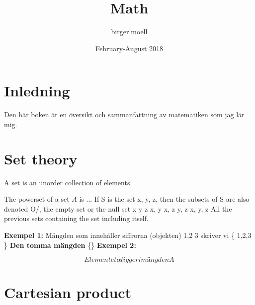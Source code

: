 \documentclass{article}
\title{Math}
\author{birger.moell }
\date{February-August 2018}
\begin{document}
\maketitle

\section{Inledning}
Den här boken är en översikt och sammanfattning av matematiken som jag lär mig.
\maketitle

\section{Set theory}

\begin{definition}[Set]
A set is an unorder collection of elements.
\end{definition}

\begin{definition}[Powerset]
The powerset of a set $A$ is ...
If S is the set {x, y, z}, then the subsets of S are
{} also denoted O/, the empty set or the null set
{x}
{y}
{z}
{x, y}
{x, z}
{y, z}
{x, y, z}
All the previous sets containing the set including itself.

\end{definition}


\textbf{Exempel 1:}
\newline
Mängden som innehåller siffrorna (objekten) 1,2 3 skriver vi
\{ 1,2,3 \}
\newline
\textbf{Den tomma mängden}
\{\}
\newline
\textbf{Exempel 2:}
\newline

\begin{equation}
  Elementet  \alpha  ligger i mängden A
\end{equation}

\section{Cartesian product}
\end{document}
